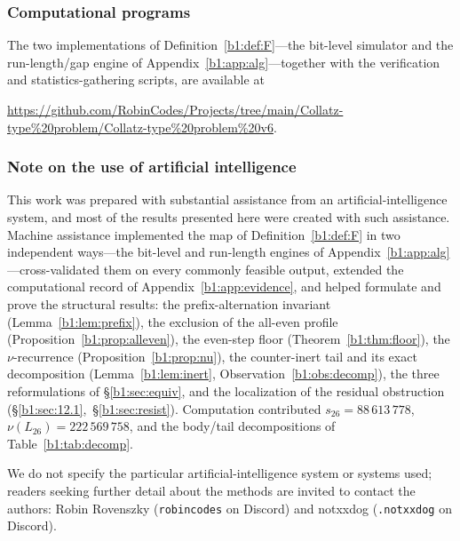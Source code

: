 \documentclass[a4paper]{article}
\theoremstyle{plain}
\theoremstyle{definition}
\theoremstyle{remark}
\begin{document}
\subsubsection{Computational programs}\label{b1:app:programs}
The two implementations of Definition~\ref{b1:def:F}---the bit-level simulator and the run-length/gap engine of Appendix~\ref{b1:app:alg}---together with the verification and statistics-gathering scripts, are available at
\begin{center}
\url{https://github.com/RobinCodes/Projects/tree/main/Collatz-type%20problem/Collatz-type%20problem%20v6}.
\end{center}

\subsubsection{Note on the use of artificial intelligence}\label{b1:app:ai}
This work was prepared with substantial assistance from an artificial-intelligence system, and most of the results presented here were created with such assistance. Machine assistance implemented the map of Definition~\ref{b1:def:F} in two independent ways---the bit-level and run-length engines of Appendix~\ref{b1:app:alg}---cross-validated them on every commonly feasible output, extended the computational record of Appendix~\ref{b1:app:evidence}, and helped formulate and prove the structural results: the prefix-alternation invariant (Lemma~\ref{b1:lem:prefix}), the exclusion of the all-even profile (Proposition~\ref{b1:prop:alleven}), the even-step floor (Theorem~\ref{b1:thm:floor}), the $\nu$-recurrence (Proposition~\ref{b1:prop:nu}), the counter-inert tail and its exact decomposition (Lemma~\ref{b1:lem:inert}, Observation~\ref{b1:obs:decomp}), the three reformulations of \S\ref{b1:sec:equiv}, and the localization of the residual obstruction (\S\ref{b1:sec:12.1},~\S\ref{b1:sec:resist}). Computation contributed $s_{26}=88\,613\,778$, $\nu(L_{26})=222\,569\,758$, and the body/tail decompositions of Table~\ref{b1:tab:decomp}.

We do not specify the particular artificial-intelligence system or systems used; readers seeking further detail about the methods are invited to contact the authors: Robin Rovenszky (\texttt{robincodes} on Discord) and notxxdog (\texttt{.notxxdog} on Discord).
\end{document}
